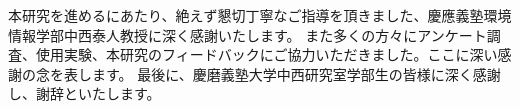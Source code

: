 \begin{acknowledgment}
本研究を進めるにあたり、絶えず懇切丁寧なご指導を頂きました、慶應義塾環境情報学部中西泰人教授に深く感謝いたします。 また多くの方々にアンケート調査、使用実験、本研究のフィードバックにご協力いただきました。ここに深い感謝の念を表します。 最後に、慶磨義塾大学中西研究室学部生の皆様に深く感謝し、謝辞といたします。 
\end{acknowledgment}
